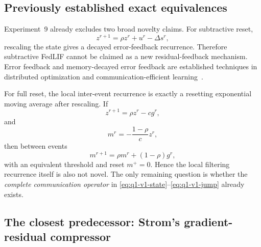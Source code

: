 \subsection{Previously established exact equivalences}

Experiment~9 already excludes two broad novelty claims. For subtractive reset,
\begin{equation}
 z^{r+1}=\rho z^r+u^r-\Delta s^r,
\end{equation}
rescaling the state gives a decayed error-feedback recurrence. Therefore subtractive FedLIF cannot be claimed as a new residual-feedback mechanism. Error feedback and memory-decayed error feedback are established techniques in distributed optimization and communication-efficient learning~\cite{stich2018memory,chen2022co3}.

For full reset, the local inter-event recurrence is exactly a resetting exponential moving average after rescaling. If
\begin{equation}
 z^{r+1}=\rho z^r-c g^r,
\end{equation}
and
\begin{equation}
 m^r=-\frac{1-\rho}{c}z^r,
\end{equation}
then between events
\begin{equation}
 m^{r+1}=\rho m^r+(1-\rho)g^r,
\end{equation}
with an equivalent threshold and reset $m^+=0$. Hence the local filtering recurrence itself is also not novel. The only remaining question is whether the \emph{complete communication operator} in \eqref{eq:q1-v1-state}--\eqref{eq:q1-v1-jump} already exists.

\subsection{The closest predecessor: Strom's gradient-residual compressor}

